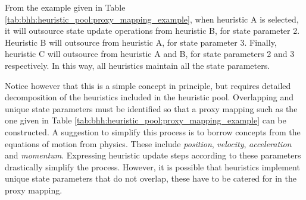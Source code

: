 \begin{table}[htbp]
	\centering
	\caption{State update operation proxy mapping example.}
	\label{tab:bhh:heuristic_pool:proxy_mapping_example}%
	\par\bigskip
\end{table}%

From the example given in Table \ref{tab:bhh:heuristic_pool:proxy_mapping_example}, when heuristic A is selected, it will outsource state update operations from heuristic B, for state parameter 2. Heuristic B will outsource from heuristic A, for state parameter 3. Finally, heuristic C will outsource from heuristic A and B, for state parameters 2 and 3 respectively. In this way, all heuristics maintain all the state parameters. 

Notice however that this is a simple concept in principle, but requires detailed decomposition of the heuristics included in the heuristic pool.  Overlapping and unique state parameters must be identified so that a proxy mapping such as the one given in Table \ref{tab:bhh:heuristic_pool:proxy_mapping_example} can be constructed. A suggestion to simplify this process is to borrow concepts from the equations of motion from physics. These include \textit{position}, \textit{velocity}, \textit{acceleration} and \textit{momentum}. Expressing heuristic update steps according to these parameters drastically simplify the process. However, it is possible that heuristics implement unique state parameters that do not overlap, these have to be catered for in the proxy mapping.

